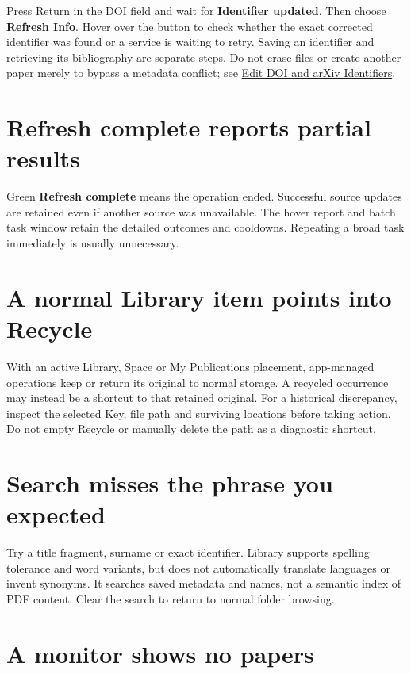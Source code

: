 \documentclass[10pt,letterpaper,oneside]{scrreprt}
\begin{document}
Press Return in the DOI field and wait for \textbf{Identifier updated}. Then choose \textbf{Refresh Info}. Hover over the button to check whether the exact corrected identifier was found or a service is waiting to retry. Saving an identifier and retrieving its bibliography are separate steps. Do not erase files or create another paper merely to bypass a metadata conflict; see \hyperref[identifiers]{Edit DOI and arXiv Identifiers}.

\section{Refresh complete reports partial results}\label{refresh-complete-reports-partial-results}

Green \textbf{Refresh complete} means the operation ended. Successful source updates are retained even if another source was unavailable. The hover report and batch task window retain the detailed outcomes and cooldowns. Repeating a broad task immediately is usually unnecessary.

\section{A normal Library item points into Recycle}\label{a-normal-library-item-points-into-recycle}

With an active Library, Space or My Publications placement, app-managed operations keep or return its original to normal storage. A recycled occurrence may instead be a shortcut to that retained original. For a historical discrepancy, inspect the selected Key, file path and surviving locations before taking action. Do not empty Recycle or manually delete the path as a diagnostic shortcut.

\section{Search misses the phrase you expected}\label{search-misses-the-phrase-you-expected}

Try a title fragment, surname or exact identifier. Library supports spelling tolerance and word variants, but does not automatically translate languages or invent synonyms. It searches saved metadata and names, not a semantic index of PDF content. Clear the search to return to normal folder browsing.

\section{A monitor shows no papers}\label{a-monitor-shows-no-papers}
\end{document}

